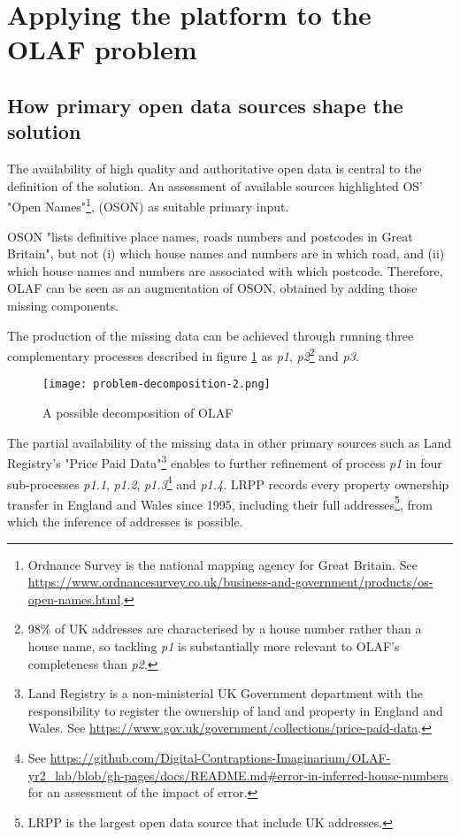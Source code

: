 \section{Applying the platform to the OLAF problem}
\label{crowdsourcing-olaf}

\subsection{How primary open data sources shape the solution}

The availability of high quality and authoritative open data is central to the definition of the solution. An assessment of available sources highlighted OS' "Open Names"\footnote{Ordnance Survey is the national mapping agency for Great Britain. See \url{https://www.ordnancesurvey.co.uk/business-and-government/products/os-open-names.html}.}, (OSON) as suitable primary input. 

OSON "lists definitive place names, roads numbers and postcodes in Great Britain", but not (i) which house names and numbers are in which road, and (ii) which house names and numbers are associated with which postcode. Therefore, OLAF can be seen as an augmentation of OSON, obtained by adding those missing components.

The production of the missing data can be achieved through running three complementary processes described in figure \ref{fig:problem_decomposition_2} as {\it p1}, {\it p2}\footnote{98\% of UK addresses are characterised by a house number rather than a house name, so tackling {\it p1} is substantially more relevant to OLAF's completeness than {\it p2}.} and {\it p3}. 

\begin{figure}
	\texttt{[image: problem-decomposition-2.png]}
	\caption{A possible decomposition of OLAF}
	\label{fig:problem_decomposition_2}
\end{figure}

The partial availability of the missing data in other primary sources such as Land Registry's "Price Paid Data"\footnote{Land Registry is a non-ministerial UK Government department with the responsibility to register the ownership of land and property in England and Wales. See \url{https://www.gov.uk/government/collections/price-paid-data}.} enables to further refinement of process {\it p1} in four sub-processes {\it p1.1}, {\it p1.2}, {\it p1.3}\footnote{See \url{https://github.com/Digital-Contraptions-Imaginarium/OLAF-yr2_lab/blob/gh-pages/docs/README.md#error-in-inferred-house-numbers} for an assessment of the impact of error.} and {\it p1.4}. LRPP records every property ownership transfer in England and Wales since 1995, including their full addresses\footnote{LRPP is the largest open data source that include UK addresses.}, from which the inference of addresses is possible.

